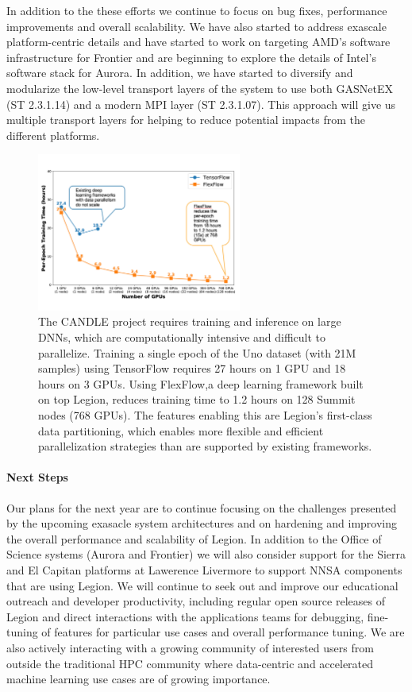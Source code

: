 In addition to the these efforts we continue to focus on bug fixes, performance 
improvements and overall scalability. We have also started to address exascale 
platform-centric details and have started to work on targeting AMD's software 
infrastructure for Frontier and are beginning to explore the details of Intel's software 
stack for Aurora. In addition, we have started to diversify and modularize 
the low-level transport layers of the system to use both GASNetEX 
(ST 2.3.1.14) and a modern MPI layer (ST 2.3.1.07). This approach will 
give us multiple transport layers for helping to reduce potential impacts 
from the different platforms. 

\begin{figure}[htb]
  \centering
  \includegraphics[width=0.6\textwidth]{projects/2.3.1-PMR/2.3.1.08-Legion/flexflow.pdf}
  \caption{The CANDLE project requires training and inference on large DNNs, which are 
    computationally intensive and difficult to parallelize. Training a single 
    epoch of the Uno dataset (with 21M samples) using TensorFlow requires 27 hours 
    on 1 GPU and 18 hours on 3 GPUs. Using FlexFlow,a deep learning framework built on 
    top  Legion, reduces training time to 1.2 hours on 128 Summit nodes (768 GPUs).
    The features enabling this are Legion’s first-class data partitioning, which enables
    more flexible and efficient parallelization strategies than are supported by 
    existing frameworks.
  }
  \label{fig:2.3.2.08:flexflow}   
\end{figure}

\paragraph{Next Steps}
Our plans for the next year are to continue focusing on the 
challenges presented by the upcoming exasacle system architectures 
and on hardening and improving the overall performance and scalability 
of Legion.  In addition to the Office of Science systems (Aurora and Frontier)
we will also consider support for the Sierra and El Capitan platforms at 
Lawerence Livermore to support NNSA components that are using Legion.  We will 
continue to seek out and improve our educational outreach and developer productivity, 
including regular open source releases of Legion and direct interactions with the 
applications teams for debugging, fine-tuning of features for particular use cases and 
overall performance tuning.  We are also actively interacting with a growing community of 
interested users from outside the traditional HPC community where data-centric and 
accelerated machine learning use cases are of growing importance.  
